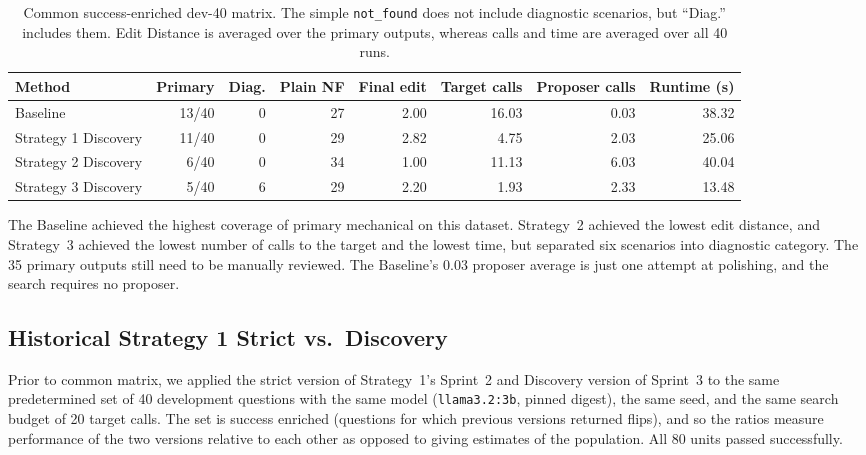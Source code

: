 \documentclass[11pt,a4paper]{article}
\begin{document}
\begin{table}[htbp]
\centering
\scriptsize
\begin{tabularx}{\textwidth}{@{}Y r r r r r r r@{}}
\toprule
\textbf{Method} & \textbf{Primary} & \textbf{Diag.} & \textbf{Plain NF} & \textbf{Final edit} & \textbf{Target calls} & \textbf{Proposer calls} & \textbf{Runtime (s)} \\
\midrule
Baseline & 13/40 & 0 & 27 & 2.00 & 16.03 & 0.03 & 38.32 \\
Strategy 1 Discovery & 11/40 & 0 & 29 & 2.82 & 4.75 & 2.03 & 25.06 \\
Strategy 2 Discovery & 6/40 & 0 & 34 & 1.00 & 11.13 & 6.03 & 40.04 \\
Strategy 3 Discovery & 5/40 & 6 & 29 & 2.20 & 1.93 & 2.33 & 13.48 \\
\bottomrule
\end{tabularx}
\caption{Common success-enriched dev-40 matrix. The simple \texttt{not\_found} does
not include diagnostic scenarios, but ``Diag.'' includes them. Edit Distance is
averaged over the primary outputs, whereas calls and time are averaged over all 40
runs.}
\label{tab:commonmatrix}
\end{table}

The Baseline achieved the highest coverage of primary mechanical on this dataset.
Strategy~2 achieved the lowest edit distance, and Strategy~3 achieved the lowest
number of calls to the target and the lowest time, but separated six scenarios into
diagnostic category. The 35 primary outputs still need to be manually reviewed. The
Baseline's 0.03 proposer average is just one attempt at polishing, and the search
requires no proposer.

\subsection{Historical Strategy 1 Strict vs.\ Discovery}
\label{sec:s1results}

Prior to common matrix, we applied the strict version of Strategy~1's Sprint~2 and
Discovery version of Sprint~3 to the same predetermined set of 40 development
questions with the same model (\texttt{llama3.2:3b}, pinned digest), the same seed,
and the same search budget of 20 target calls. The set is success enriched (questions
for which previous versions returned flips), and so the ratios measure performance
of the two versions relative to each other as opposed to giving estimates of the
population. All 80 units passed successfully.
\end{document}
